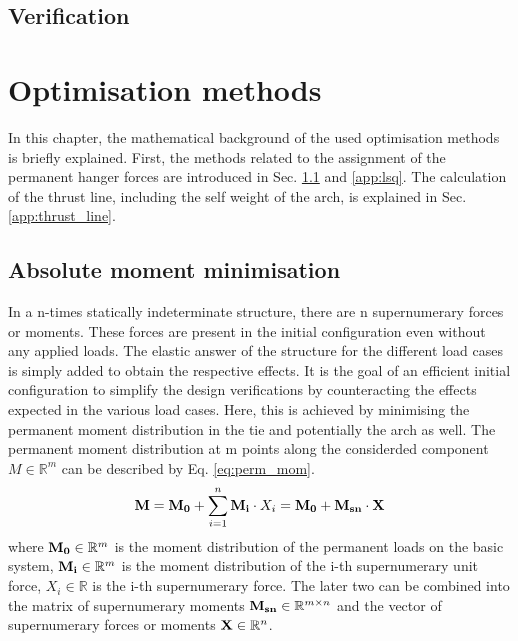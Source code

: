 \newpage
\subsection{Verification}

\newpage
\section{Optimisation methods}
In this chapter, the mathematical background of the used optimisation methods is briefly explained. First, the methods related to the assignment of the permanent hanger forces are introduced in Sec. \ref{app:moment_min} and \ref{app:lsq}. The calculation of the thrust line, including the self weight of the arch, is explained in Sec. \ref{app:thrust_line}.

\subsection{Absolute moment minimisation} \label{app:moment_min}
In a n-times statically indeterminate structure, there are n supernumerary forces or moments. These forces are present in the initial configuration even without any applied loads. The elastic answer of the structure for the different load cases is simply added to obtain the respective effects. It is the goal of an efficient initial configuration to simplify the design verifications by counteracting the effects expected in the various load cases. Here, this is achieved by minimising the permanent moment distribution in the tie and potentially the arch as well. The permanent moment distribution at m points along the considerded component $M \in \mathbb{R}^m$ can be described by Eq. \eqref{eq:perm_mom}. 
\begin{equation}
    {\bf M} = {\bf M_0} + \sum_{i=1}^{n} {\bf M_i} \cdot X_i = {\bf M_0} + {\bf M_{sn}} \cdot {\bf X}
    \label{eq:perm_mom}
\end{equation}
where ${\bf M_0} \in \mathbb{R}^m$ is the moment distribution of the permanent loads on the basic system, ${\bf M_i} \in \mathbb{R}^m$ is the moment distribution of the i-th supernumerary unit force, ${X_i} \in \mathbb{R}$ is the i-th supernumerary force. The later two can be combined into the matrix of supernumerary moments ${\bf M_{sn}} \in  \mathbb{R}^{m\times n}$ and the vector of supernumerary forces or moments ${\bf X} \in \mathbb{R}^n$.

